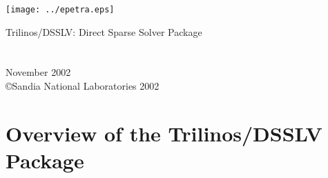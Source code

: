 \documentclass[letterpaper]{book}
\begin{document}
\begin{titlepage}
\texttt{[image: ../epetra.eps]}
\begin{center}
{\Huge Trilinos/DSSLV: Direct Sparse Solver Package\\[1ex]\large }\\
\vspace*{1cm}\\
\vspace*{0.5cm}
{\small November 2002}\\
\copyright Sandia National Laboratories 2002
\end{center}
\end{titlepage}
\clearemptydoublepage
{}
\tableofcontents
\clearemptydoublepage
{}
\chapter{Overview of the Trilinos/DSSLV Package}

\end{document}
